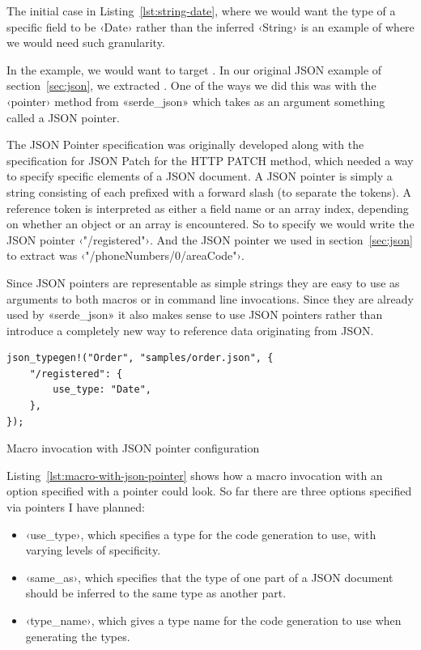 The initial case in Listing~\ref{lst:string-date}, where we would want the type of a specific field to be ‹Date› rather than the inferred ‹String› is an example of where we would need such granularity.

In the example, we would want to target . In our original JSON example of section~\ref{sec:json}, we extracted . One of the ways we did this was with the ‹pointer› method from «serde_json» which takes as an argument something called a JSON pointer.

The JSON Pointer specification \cite{RFC6901} was originally developed along with the specification for JSON Patch \cite{RFC6902} for the HTTP PATCH method, which needed a way to specify specific elements of a JSON document. A JSON pointer is simply a string consisting of  each prefixed with a forward slash (to separate the tokens). A reference token is interpreted as either a field name or an array index, depending on whether an object or an array is encountered. So to specify  we would write the JSON pointer ‹"/registered"›. And the JSON pointer we used in section~\ref{sec:json} to extract  was ‹"/phoneNumbers/0/areaCode"›.

Since JSON pointers are representable as simple strings they are easy to use as arguments to both macros or in command line invocations. Since they are already used by «serde_json» it also makes sense to use JSON pointers rather than introduce a completely new way to reference data originating from JSON.

\begin{listing}[ht!]
\begin{verbatim}
json_typegen!("Order", "samples/order.json", {
    "/registered": {
        use_type: "Date",
    },
});
\end{verbatim}
\caption{Macro invocation with JSON pointer configuration}
\label{lst:macro-with-json-pointer}
\end{listing}

Listing~\ref{lst:macro-with-json-pointer} shows how a macro invocation with an option specified with a pointer could look. So far there are three options specified via pointers I have planned:

\begin{itemize}
  \item ‹use_type›, which specifies a type for the code generation to use, with varying levels of specificity.
  \item ‹same_as›, which specifies that the type of one part of a JSON document should be inferred to the same type as another part.
  \item ‹type_name›, which gives a type name for the code generation to use when generating the types.
\end{itemize}

